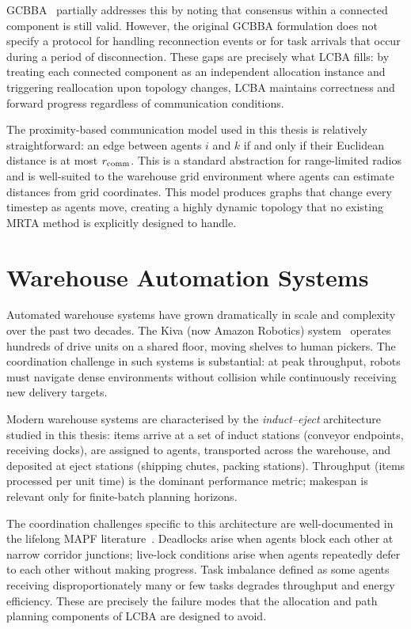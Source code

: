 GCBBA~\cite{kha2025enhancing} partially addresses this by noting that
consensus within a connected component is still valid.
However, the original GCBBA formulation does not specify a protocol for
handling reconnection events or for task arrivals that occur during a period
of disconnection.
These gaps are precisely what LCBA fills: by treating each connected component
as an independent allocation instance and triggering reallocation upon topology
changes, LCBA maintains correctness and forward progress regardless of
communication conditions.

The proximity-based communication model used in this thesis is relatively straightforward:
an edge between
agents $i$ and $k$ if and only if their Euclidean distance is at most $r_{\text{comm}}$.
 This is a standard abstraction for range-limited radios and is well-suited to
the warehouse grid environment where agents can estimate distances from
grid coordinates.
This model produces graphs that change every timestep as agents move, creating
a highly dynamic topology that no existing MRTA method is explicitly designed
to handle.


\section{Warehouse Automation Systems}
\label{sec:bg_warehouse}

Automated warehouse systems have grown dramatically in scale and complexity
over the past two decades.
The Kiva (now Amazon Robotics) system~\cite{wurman2008coordinating} operates
hundreds of drive units on a shared floor, moving shelves to human pickers.
The coordination challenge in such systems is substantial: at peak throughput,
robots must navigate dense environments without collision while continuously
receiving new delivery targets.

Modern warehouse systems are characterised by the \emph{induct--eject}
architecture studied in this thesis: items arrive at a set of induct stations
(conveyor endpoints, receiving docks), are assigned to agents, transported
across the warehouse, and deposited at eject stations (shipping chutes, packing
stations).
Throughput (items processed per unit time) is the dominant performance
metric; makespan is relevant only for finite-batch planning horizons.

The coordination challenges specific to this architecture are well-documented
in the lifelong MAPF literature~\cite{li2021lifelong}.
Deadlocks arise when agents block each other at narrow corridor junctions;
live-lock conditions arise when agents repeatedly defer to each other without
making progress.
Task imbalance defined as some agents receiving disproportionately many or few tasks
degrades throughput and energy efficiency.
These are precisely the failure modes that the allocation and path planning
components of LCBA are designed to avoid.


